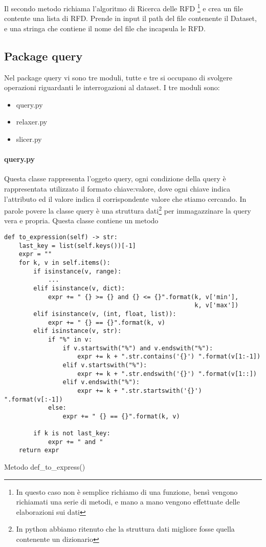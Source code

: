 Il secondo metodo richiama l'algoritmo di Ricerca delle RFD \footnote{In questo caso non è semplice richiamo di una funzione, bensì vengono richiamati una serie di metodi, e mano a mano vengono effettuate delle elaborazioni sui dati} e crea un file contente una lista di RFD. Prende in input il path del file contenente il Dataset, e una stringa che contiene il nome del file che incapsula le RFD. 

\subsection{Package query}
Nel package query vi sono tre moduli, tutte e tre si occupano di svolgere operazioni riguardanti le interrogazioni al dataset.
I tre moduli sono:
\begin{itemize}[noitemsep]
\let\labelitemi\labelitemii
    \item query.py
    \item relaxer.py
    \item slicer.py
\end{itemize}

\paragraph{query.py}
Questa classe rappresenta l'oggeto query, ogni condizione della query è rappresentata utilizzato il formato chiave:valore, dove ogni chiave indica l'attributo ed il valore indica il corrispondente valore che stiamo cercando. In parole povere la classe query è una struttura dati\footnote{In python abbiamo ritenuto che la struttura dati migliore fosse quella contenente un dizionario} per immagazzinare la query vera e propria.
Questa classe contiene un metodo
\begin{listing}[H]
\begin{verbatim}
def to_expression(self) -> str:
    last_key = list(self.keys())[-1]
    expr = ""
    for k, v in self.items():
        if isinstance(v, range):
            ...
        elif isinstance(v, dict):
            expr += " {} >= {} and {} <= {}".format(k, v['min'],
                                                    k, v['max'])
        elif isinstance(v, (int, float, list)):
            expr += " {} == {}".format(k, v)
        elif isinstance(v, str):
            if "%" in v:
                if v.startswith("%") and v.endswith("%"):
                    expr += k + ".str.contains('{}') ".format(v[1:-1])
                elif v.startswith("%"):
                    expr += k + ".str.endswith('{}') ".format(v[1::])
                elif v.endswith("%"):
                    expr += k + ".str.startswith('{}') ".format(v[:-1])
            else:
                expr += " {} == {}".format(k, v)

        if k is not last_key:
            expr += " and "
    return expr
\end{verbatim}
\caption{Metodo def{\_}to{\_}express()}
\label{Code:9}
\end{listing}

